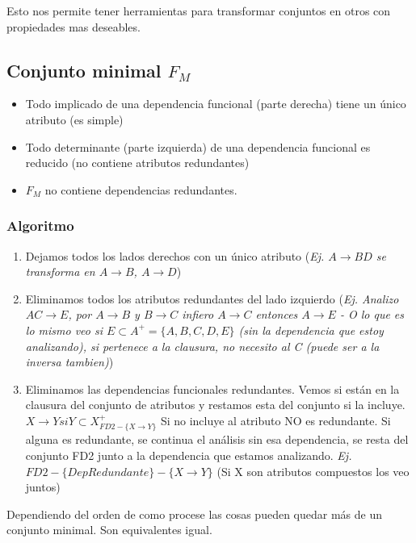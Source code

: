 \medskip
Esto nos permite tener herramientas para transformar conjuntos en otros con propiedades mas deseables.


\subsection*{Conjunto minimal $F_M$}
\begin{itemize}
\item Todo implicado de una dependencia funcional (parte derecha) tiene un único atributo (es simple)
\item Todo determinante (parte izquierda) de una dependencia funcional es reducido (no contiene atributos redundantes)
\item $F_M$ no contiene dependencias redundantes.
\end{itemize}


\subsubsection*{Algoritmo}
\begin{enumerate}
\item Dejamos todos los lados derechos con un único atributo (\textit{Ej. $A\rightarrow BD$ se transforma en $A\rightarrow B$, $A\rightarrow D$})
\item Eliminamos todos los atributos redundantes del lado izquierdo (\textit{Ej. Analizo $AC\rightarrow E$, por $A\rightarrow B$ y $B\rightarrow C$ infiero $A\rightarrow C$ entonces $A\rightarrow E$ - O lo que es lo mismo veo si $E \subset A^+ =\{ A,B,C,D,E\}$ (sin la dependencia que estoy analizando), si pertenece a la clausura, no necesito al C (puede ser a la inversa tambien)})
\item Eliminamos las dependencias funcionales redundantes. Vemos si están en la clausura del conjunto de atributos y restamos esta del conjunto si la incluye. $X\rightarrow Y si Y\subset X^+_{FD2-\{X\rightarrow Y\}}$ Si no incluye al atributo NO es redundante. Si alguna es redundante, se continua el análisis sin esa dependencia, se resta del conjunto FD2 junto a la dependencia que estamos analizando. \textit{Ej. $FD2-\{DepRedundante\}-\{X\rightarrow Y\}$} (Si X son atributos compuestos los veo juntos)
\end{enumerate}


Dependiendo del orden de como procese las cosas pueden quedar más de un conjunto minimal. Son equivalentes igual.

